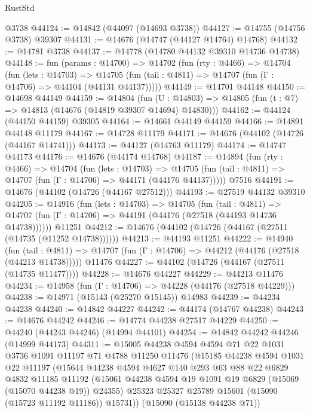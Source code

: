 \begin{lexlean}{RustStd}
\begin{coremodule}
    @3738
@44124 := @14842 (@44097 (@14693 @3738))
@44127 := @14755 (@14756 @3738) @39307
@44131 := @14676 (@14747 (@44127 @14764) @14768)
@44132 := @14781 @3738
@44137 := @14778 (@14780 @44132 @39310 @14736 @14738)
@44148 := fun (params : @14700) =>
  @14702
    (fun (rty : @4466) =>
    @14704
      (fun (lets : @14703) =>
      @14705 (fun (tail : @4811) => @14707 (fun (Γ : @14706) => @44104 (@44131 @44137)))))
@44149 := @14701 @44148
@44150 := @14698 @44149
@44159 := @14804
    (fun (U : @14803) => @14805 (fun (t : @7) => @14813 (@14676 (@14819 @39307 @14694) @14830)))
@44162 := @44124 (@44150 @44159) @39305
@44164 := @14661 @44149 @44159
@44166 := @14891 @44148 @11179
@44167 := @14728 @11179
@44171 := @14676 (@44102 (@14726 (@44167 @14741)))
@44173 := @44127 (@14763 @11179)
@44174 := @14747 @44173
@44176 := @14676 (@44174 @14768)
@44187 := @14894
    (fun (rty : @4466) =>
    @14704
      (fun (lets : @14703) =>
      @14705 (fun (tail : @4811) => @14707 (fun (Γ : @14706) => @44171 (@44176 @44137)))))
    @7516
@44191 := @14676 (@44102 (@14726 (@44167 @27512)))
@44193 := @27519 @44132 @39310
@44205 := @14916
    (fun (lets : @14703) =>
    @14705
      (fun (tail : @4811) =>
      @14707 (fun (Γ : @14706) => @44191 (@44176 (@27518 (@44193 @14736 @14738))))))
    @11251
@44212 := @14676 (@44102 (@14726 (@44167 (@27511 (@14735 (@11252 @14738))))))
@44213 := @44193 @11251
@44222 := @14940
    (fun (tail : @4811) => @14707 (fun (Γ : @14706) => @44212 (@44176 (@27518 (@44213 @14738)))))
    @11476
@44227 := @44102 (@14726 (@44167 (@27511 (@14735 @11477))))
@44228 := @14676 @44227
@44229 := @44213 @11476
@44234 := @14958 (fun (Γ : @14706) => @44228 (@44176 (@27518 @44229)))
@44238 := @14971 (@15143 (@25270 @15145)) @14983
@44239 := @44234 @44238
@44240 := @14842 @44227
@44242 := @44174 (@14767 @44238)
@44243 := @14676 @44242
@44246 := @14774 @44238 @27517 @44229
@44250 := @44240 (@44243 @44246) (@14994 @44101)
@44254 := @14842 @44242 @44246 (@14999 @44173)
@44311 := @15005
    @44238
    @4594
    @4594
    @71
    @22
    @1031
    @3736
    @1091
    @11197
    @71
    @4788
    @11250
    @11476
    (@15185
      @44238
      @4594
      @1031
      @22
      @11197
      (@15644
        @44238
        @4594
        @4627
        @140
        @293
        @63
        @88
        @22
        @6829
        @4832
        @11185
        @11192
        (@15061 @44238 @4594 @19 @1091 @19 @6829 (@15069 (@15070 @44238 @19)) @24355)
        @25323
        @25327
        @25789
        @15601
        (@15090 (@15723 @11192 @11186))
        @15731))
    (@15090 (@15138 @44238 @71))

\end{coremodule}
\end{lexlean}
